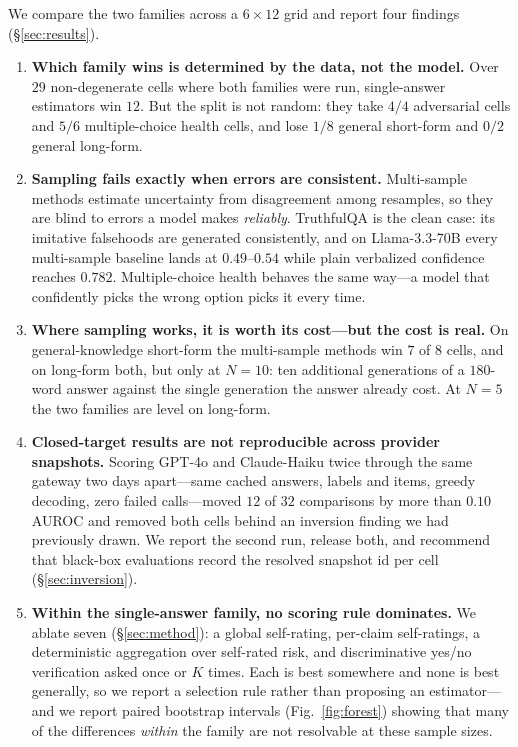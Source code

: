 \documentclass[11pt]{article}
\begin{document}
We compare the two families across a $6\times12$ grid and report four findings
(\S\ref{sec:results}).
\begin{enumerate}[leftmargin=1.4em,itemsep=1pt,topsep=2pt]
\item \textbf{Which family wins is determined by the data, not the model.} Over $29$
non-degenerate cells where both families were run, single-answer estimators win $12$. But the
split is not random: they take $4/4$ adversarial cells and $5/6$ multiple-choice health cells,
and lose $1/8$ general short-form and $0/2$ general long-form.
\item \textbf{Sampling fails exactly when errors are consistent.} Multi-sample methods estimate
uncertainty from disagreement among resamples, so they are blind to errors a model makes
\emph{reliably}. TruthfulQA is the clean case: its imitative falsehoods are generated
consistently, and on Llama-3.3-70B every multi-sample baseline lands at $0.49$--$0.54$ while
plain verbalized confidence reaches $0.782$. Multiple-choice health behaves the same way---a
model that confidently picks the wrong option picks it every time.
\item \textbf{Where sampling works, it is worth its cost---but the cost is real.} On
general-knowledge short-form the multi-sample methods win $7$ of $8$ cells, and on long-form both,
but only at $N{=}10$: ten additional generations of a $180$-word answer against the single
generation the answer already cost. At $N{=}5$ the two families are level on long-form.
\item \textbf{Closed-target results are not reproducible across provider snapshots.} Scoring
GPT-4o and Claude-Haiku twice through the same gateway two days apart---same cached answers,
labels and items, greedy decoding, zero failed calls---moved $12$ of $32$ comparisons by more
than $0.10$ AUROC and removed both cells behind an inversion finding we had previously drawn.
We report the second run, release both, and recommend that black-box evaluations record the
resolved snapshot id per cell (\S\ref{sec:inversion}).
\item \textbf{Within the single-answer family, no scoring rule dominates.} We ablate seven
(\S\ref{sec:method}): a global self-rating, per-claim self-ratings, a deterministic aggregation
over self-rated risk, and discriminative yes/no verification asked once or $K$ times. Each is
best somewhere and none is best generally, so we report a selection rule rather than proposing an
estimator---and we report paired bootstrap intervals (Fig.~\ref{fig:forest}) showing that many
of the differences \emph{within} the family are not resolvable at these sample sizes.
\end{enumerate}
\end{document}
